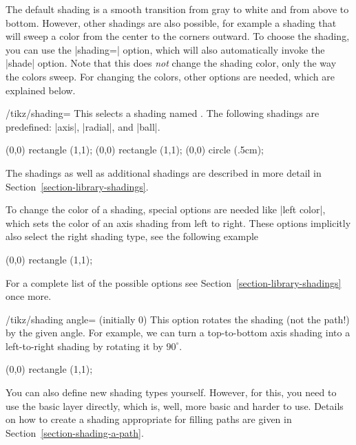 The default shading is a smooth transition from gray
to white and from above to bottom. However, other shadings are also
possible, for example a shading that will sweep a color from the
center to the corners outward. To choose the shading, you can use the
|shading=| option, which will also automatically invoke the |shade|
option. Note that this does \emph{not} change the shading color, only
the way the colors sweep. For changing the colors, other options are
needed, which are explained below.

\begin{key}{/tikz/shading=}
  This selects a shading named . The following shadings are
  predefined: |axis|, |radial|, and |ball|.
\begin{codeexample}[]
\tikz \shadedraw [shading=axis] (0,0) rectangle (1,1);
\tikz \shadedraw [shading=radial] (0,0) rectangle (1,1);
\tikz \shadedraw [shading=ball] (0,0) circle (.5cm);
\end{codeexample}

  The shadings as well as additional shadings are described in more
  detail in Section~\ref{section-library-shadings}.

  To change the color of a shading, special options are needed like
  |left color|, which sets the color of an axis shading from left to
  right. These options implicitly also select the right shading type,
  see the following example
\begin{codeexample}[]
\tikz \shadedraw [left color=red,right color=blue]
    (0,0) rectangle (1,1);
\end{codeexample}

  For a complete list of the possible options see
  Section~\ref{section-library-shadings} once more.

  \begin{key}{/tikz/shading angle= (initially 0)}
    This option rotates the shading (not the path!) by the given
    angle. For example, we can turn a top-to-bottom axis shading into a
    left-to-right shading by rotating it by $90^\circ$.

\begin{codeexample}[]
\tikz \shadedraw [shading=axis,shading angle=90] (0,0) rectangle (1,1);
\end{codeexample}
  \end{key}
\end{key}

You can also define new shading types yourself. However, for this, you
need to use the basic layer directly, which is, well, more basic and
harder to use. Details on how to create a shading appropriate for
filling paths are given in Section~\ref{section-shading-a-path}.



